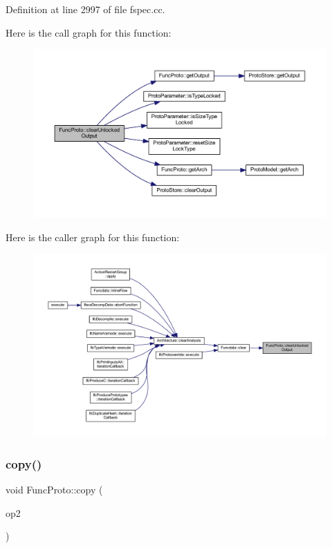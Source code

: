 Definition at line 2997 of file fspec.\+cc.

Here is the call graph for this function\+:
\nopagebreak
\begin{figure}[H]
\begin{center}
\leavevmode
\includegraphics[width=350pt]{class_func_proto_a3c7428f70c6c7e040b4d090f3efeee08_cgraph}
\end{center}
\end{figure}
Here is the caller graph for this function\+:
\nopagebreak
\begin{figure}[H]
\begin{center}
\leavevmode
\includegraphics[width=350pt]{class_func_proto_a3c7428f70c6c7e040b4d090f3efeee08_icgraph}
\end{center}
\end{figure}
\mbox{\label{class_func_proto_a9bd4f3bc764b11b57f4e71b9d19df27d}} 
\subsubsection{\texorpdfstring{copy()}{copy()}}
{\footnotesize\ttfamily void Func\+Proto\+::copy (\begin{DoxyParamCaption}\item[{const \mbox{\hyperlink{class_func_proto}{Func\+Proto}} \&}]{op2 }\end{DoxyParamCaption})}



